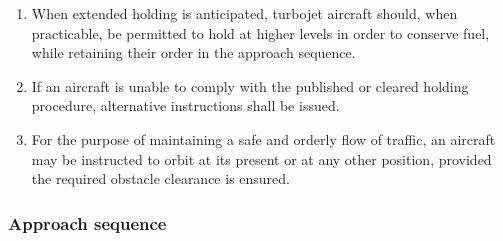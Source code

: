 \documentclass[../vATM.tex]{subfiles}
\begin{document}
\begin{enumerate}
        \item When extended holding is anticipated, turbojet aircraft should, when practicable, be permitted to hold at higher levels in order to conserve fuel, while retaining their order in the approach sequence.
        \item If an aircraft is unable to comply with the published or cleared holding procedure, alternative instructions shall be issued.
        \item For the purpose of maintaining a safe and orderly flow of traffic, an aircraft may be instructed to orbit at its present or at any other position, provided the required obstacle clearance is ensured.
    \end{enumerate}

    \subsubsection{Approach sequence}
\end{document}
